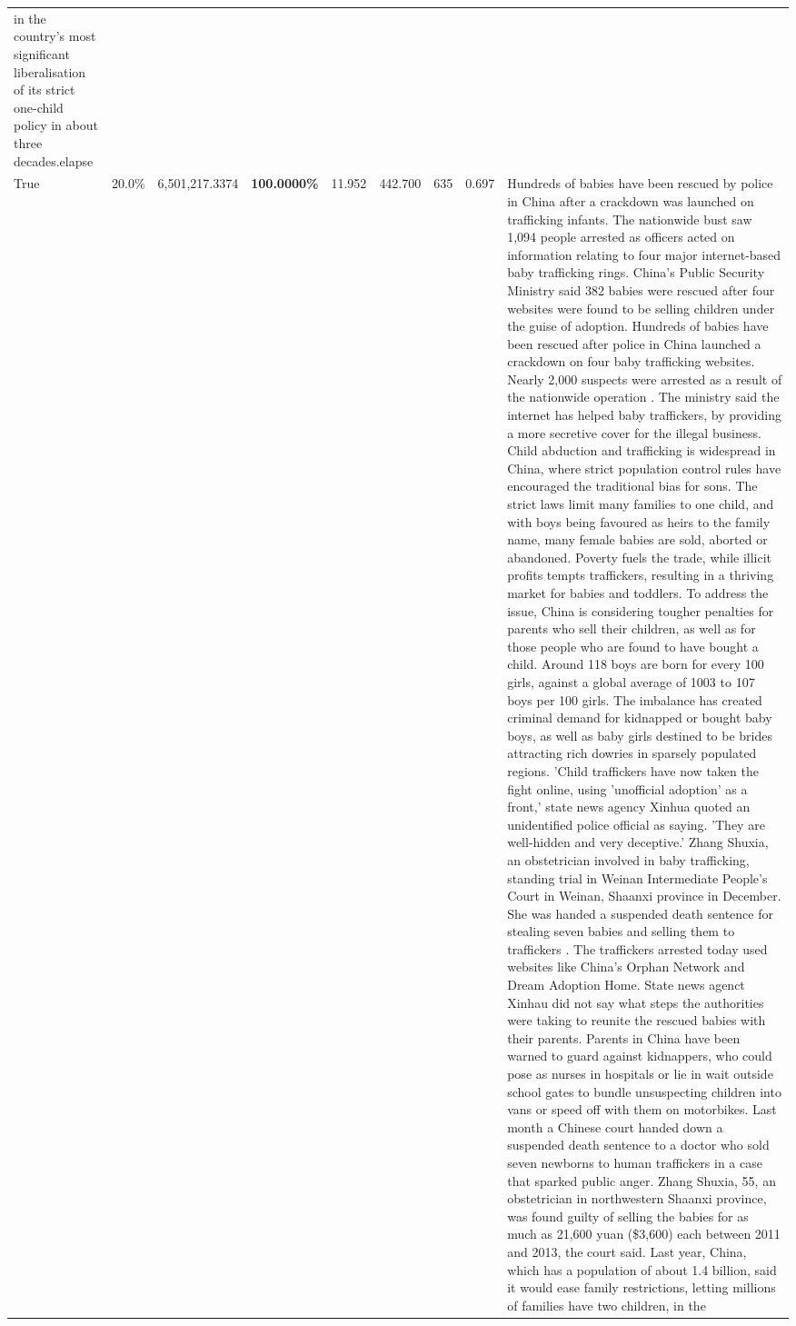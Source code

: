 \begin{table}[H]
\begin{tabular}{lllrlllll}
in the country's most significant liberalisation of its strict one-child policy in about three decades.elapse \\
\cline{1-9}
True & 20.0\% & 6,501,217.3374 & \bfseries \color{red} 100.0000\% & 11.952 & 442.700 & 635 & 0.697 & Hundreds of babies have been rescued by police in China after a crackdown was launched on trafficking infants. The nationwide bust saw 1,094 people arrested as officers acted on information relating to four major internet-based baby trafficking rings. China's Public Security Ministry said 382 babies were rescued after four websites were found to be selling children under the guise of adoption. Hundreds of babies have been rescued after police in China launched a crackdown on four baby trafficking websites. Nearly 2,000 suspects were arrested as a result of the nationwide operation . The ministry said the internet has helped baby traffickers, by providing a more secretive cover for the illegal business. Child abduction and trafficking is widespread in China, where strict population control rules have encouraged the traditional bias for sons. The strict laws limit many families to one child, and with boys being favoured as heirs to the family name, many female babies are sold, aborted or abandoned. Poverty fuels the trade, while illicit profits tempts traffickers, resulting in a thriving market for babies and toddlers. To address the issue, China is considering tougher penalties for parents who sell their children, as well as for those people who are found to have bought a child. Around 118 boys are born for every 100 girls, against a global average of 1003 to 107 boys per 100 girls. The imbalance has created criminal demand for kidnapped or bought baby boys, as well as baby girls destined to be brides attracting rich dowries in sparsely populated regions. 'Child traffickers have now taken the fight online, using 'unofficial adoption' as a front,' state news agency Xinhua quoted an unidentified police official as saying. 'They are well-hidden and very deceptive.' Zhang Shuxia, an obstetrician involved in baby trafficking, standing trial in Weinan Intermediate People's Court in Weinan, Shaanxi province in December. She was handed a suspended death sentence for stealing seven babies and selling them to traffickers . The traffickers arrested today used websites like China's Orphan Network and Dream Adoption Home. State news agenct Xinhau did not say what steps the authorities were taking to reunite the rescued babies with their parents. Parents in China have been warned to guard against kidnappers, who could pose as nurses in hospitals or lie in wait outside school gates to bundle unsuspecting children into vans or speed off with them on motorbikes. Last month a Chinese court handed down a suspended death sentence to a doctor who sold seven newborns to human traffickers in a case that sparked public anger. Zhang Shuxia, 55, an obstetrician in northwestern Shaanxi province, was found guilty of selling the babies for as much as 21,600 yuan (\$3,600) each between 2011 and 2013, the court said. Last year, China, which has a population of about 1.4 billion, said it would ease family restrictions, letting millions of families have two children, in the 
\end{tabular}
\end{table}
